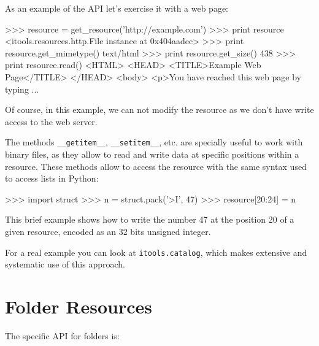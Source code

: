 As an example of the API let's exercise it with a web page:

\begin{code}
    >>> resource = get_resource('http://example.com')
    >>> print resource
    <itools.resources.http.File instance at 0x404aadec>
    >>> print resource.get_mimetype()
    text/html
    >>> print resource.get_size()
    438
    >>> print resource.read()
    <HTML>
    <HEAD>
      <TITLE>Example Web Page</TITLE>
    </HEAD> 
    <body>  
    <p>You have reached this web page by typing
    ...
\end{code}

Of course, in this example, we can not modify the resource as we don't have
write access to the web server.

The methods {\tt \_\_getitem\_\_}, {\tt \_\_setitem\_\_}, etc. are specially
useful to work with binary files, as they allow to read and write data at
specific positions within a resource. These methods allow to access the
resource with the same syntax used to access lists in Python:

\begin{code}
    >>> import struct
    >>> n = struct.pack('>I', 47)
    >>> resource[20:24] = n
\end{code}

This brief example shows how to write the number 47 at the position 20 of
a given resource, encoded as an 32 bits unsigned integer.

For a real example you can look at {\tt itools.catalog}, which makes
extensive and systematic use of this approach.


\section{Folder Resources}

The specific API for folders is:

